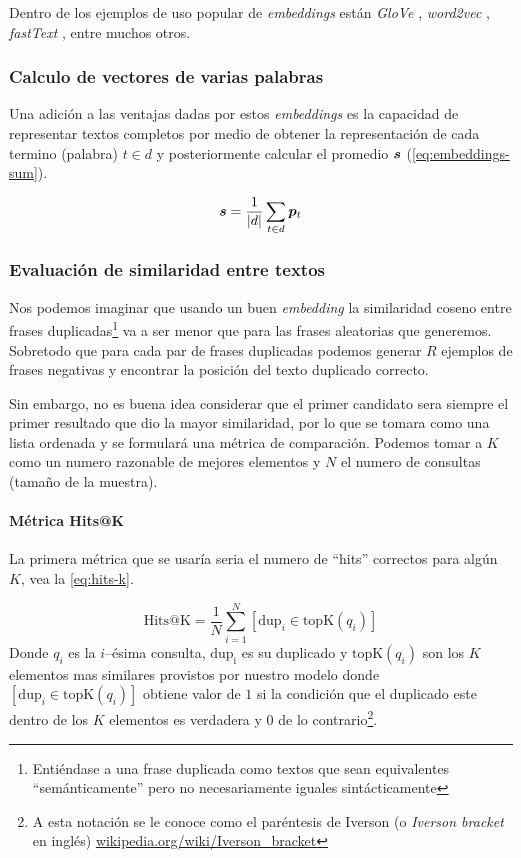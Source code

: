 Dentro de los ejemplos de uso popular de \textit{embeddings} están \emph{GloVe} \cite{pennington2014glove}, \emph{word2vec} \cite{Mikolov2014}, \emph{fastText} \cite{joulin2016fasttext}, entre muchos otros.

\subsubsection{Calculo de vectores de varias palabras}
Una adición a las ventajas dadas por estos \emph{embeddings} es la capacidad de representar textos completos por medio de obtener la representación de cada termino (palabra) $t \in d$ y posteriormente calcular el promedio ${\bm{s}}$ (\cref{eq:embeddings-sum}).

\begin{equation} \label{eq:embeddings-sum}
  {\bm{s}} = \frac{1}{|d|} \sum_{t \in d} {\bm{p}}_{t}
\end{equation}

\subsubsection{Evaluación de similaridad entre textos}
Nos podemos imaginar que usando un buen \emph{embedding} la similaridad coseno entre frases duplicadas\footnote{Entiéndase a una frase duplicada como textos que sean equivalentes ``semánticamente'' pero no necesariamente iguales sintácticamente} va a ser menor que para las frases aleatorias que generemos. Sobretodo que para cada par de frases duplicadas podemos generar $R$ ejemplos de frases negativas y encontrar la posición del texto duplicado correcto.

Sin embargo, no es buena idea considerar que el primer candidato sera siempre el primer resultado que dio la mayor similaridad, por lo que se tomara como una lista ordenada y se formulará una métrica de comparación. Podemos tomar a $K$ como un numero razonable de mejores elementos y $N$ el numero de consultas (tamaño de la muestra).

\paragraph{Métrica Hits@K}
La primera métrica que se usaría seria el numero de ``hits'' correctos para algún $K$, vea la \cref{eq:hits-k}.

\begin{equation} \label{eq:hits-k}
  \mathrm{Hits@K} = \frac{1}{N} \sum_{i=1}^{N} [\mathrm{dup}_i \in \mathrm{topK}(q_i)]
\end{equation}
Donde $q_i$ es la $i$--\'esima consulta, $\mathrm{dup_i}$ es su duplicado y $\mathrm{topK}(q_i)$ son los $K$ elementos mas similares provistos por nuestro modelo donde $[\mathrm{dup}_i \in \mathrm{topK}(q_i)]$ obtiene valor de $1$ si la condición que el duplicado este dentro de los $K$ elementos es verdadera y $0$ de lo contrario\footnote{A esta notación se le conoce como el paréntesis de Iverson (o \textsl{Iverson bracket} en inglés) \href{https://en.wikipedia.org/wiki/Iverson\_bracket}{wikipedia.org/wiki/Iverson\_bracket}}.

